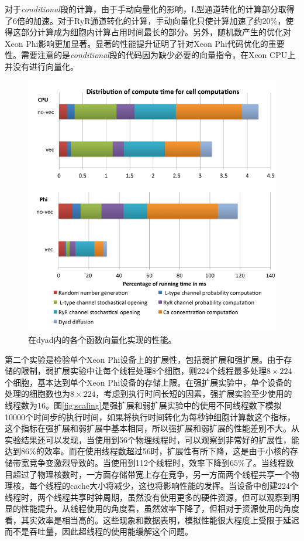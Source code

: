 对于\textit{conditional}段的计算，由于手动向量化的影响，L型通道转化的计算部分取得了6倍的加速。对于RyR通道转化的计算，手动向量化只使计算加速了约$20\%$，使得这部分计算成为细胞内计算占用时间最长的部分。另外，随机数产生的优化对Xeon Phi影响更加显著。显著的性能提升证明了针对Xeon Phi代码优化的重要性。需要注意的是\textit{conditional}段的代码因为缺少必要的向量指令，在Xeon CPU上并没有进行向量化。

\begin{figure}[htb]
\includegraphics[width=\linewidth]{figs/perf1crop.pdf}
\caption{在dyad内的各个函数向量化实现的性能。}
\label{fig:optimizations}
\end{figure}

第二个实验是检验单个Xeon Phi设备上的扩展性，包括弱扩展和强扩展。由于存储的限制，弱扩展实验中让每个线程处理8个细胞，则224个线程最多处理$8\times224$个细胞，基本达到单个Xeon Phi设备的存储上限。在强扩展实验中，单个设备的处理的细胞数也为$8\times224$，考虑到执行时间长短的因素，强扩展实验至少使用的线程数为$16$。图\ref{fig:scaling}是强扩展和弱扩展实验中的使用不同线程数下模拟10000个时间步的执行时间，如果将执行时间转化为每秒钟细胞计算数这个指标，这个指标在强扩展和弱扩展中基本相同，所以强扩展和弱扩展的性能差别不大。从实验结果还可以发现，当使用到56个物理线程时，可以观察到非常好的扩展性，能达到$86\%$的效率。而在使用线程数超过56时，扩展性有所下降，这是由于小核的存储带宽竞争变激烈导致的。当使用到112个线程时，效率下降到$65\%$了。当线程数目超过了物理核数时，一方面存储带宽上存在竞争，另一方面两个线程共享一个物理核，每个线程的cache大小将减少，这也将影响性能的发挥。当设备中创建224个线程时，两个线程共享时钟周期，虽然没有使用更多的硬件资源，但可以观察到明显的性能提升。从线程使用的角度看，虽然效率下降了，但相对于资源使用的角度看，其实效率是相当高的。这些现象和数据表明，模拟性能很大程度上受限于延迟而不是吞吐量，因此超线程的使用能缓解这个问题。

